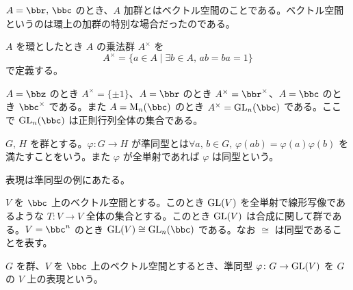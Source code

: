 \documentclass[a4paper]{ltjsarticle}
\begin{document}
\begin{exm}
  $A = \bbr,\,\bbc$ のとき、$A$ 加群とはベクトル空間のことである。ベクトル空間というのは環上の加群の特別な場合だったのである。
\end{exm}

\begin{dfn}[乗法群]
  $A$ を環としたとき $A$ の乗法群 $A^\times$ を
  \begin{equation}
    A^\times = \{a\in A\mid\exists b\in A,\,ab=ba=1\}
  \end{equation}
  で定義する。
\end{dfn}

\begin{exm}
  $A=\bbz$ のとき $A^\times = \{\pm 1\}$、$A=\bbr$ のとき $A^\times = \bbr^\times$、$A=\bbc$ のとき $\bbc^\times$ である。また $A=\M_n(\bbc)$ のとき $A^\times = \GL_n(\bbc)$ である。ここで $\GL_n(\bbc)$ は正則行列全体の集合である。
\end{exm}

\begin{dfn}[群の準同型]
  $G,\,H$ を群とする。$\varphi\colon G\to H$ が準同型とは$\forall a,\,b\in G,\,\varphi(ab) = \varphi(a)\varphi(b)$ を満たすことをいう。また $\varphi$ が全単射であれば $\varphi$ は同型という。
\end{dfn}

表現は準同型の例にあたる。

$V$ を $\bbc$ 上のベクトル空間とする。このとき $\text{GL}(V)$ を全単射で線形写像であるような $T\colon V\to V$ 全体の集合とする。このとき $\text{GL}(V)$ は合成に関して群である。$V = \bbc^n$ のとき $\GL(V)\cong\GL_n(\bbc)$ である。なお $\cong$ は同型であることを表す。

\begin{dfn}[群の表現]
  $G$ を群、$V$ を $\bbc$ 上のベクトル空間とするとき、準同型 $\varphi\colon G\to\text{GL}(V)$ を $G$ の $V$ 上の表現という。
\end{dfn}
\end{document}
